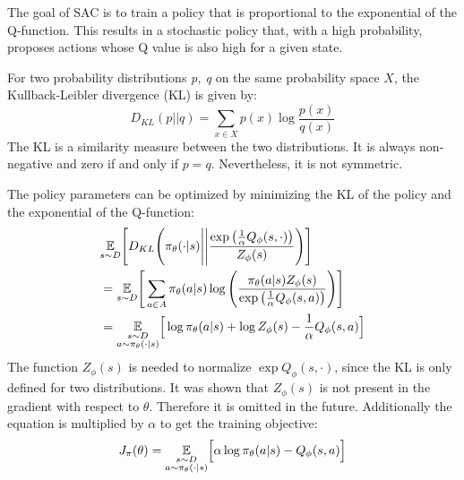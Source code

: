 The goal of SAC is to train a policy that is proportional to the exponential of the Q-function. This results in a stochastic policy that, with a high probability, proposes actions whose Q value is also high for a given state.
\begin{definition}
    For two probability distributions \emph{p, q} on the same probability space $X$, the Kullback-Leibler divergence (KL) \cite{kullbackInformationSufficiency1951} is given by:
    \begin{equation}
        D_{KL}(p||q) = \sum_{x\in X}p(x) \log \frac{p(x)}{q(x)}
    \end{equation}
    The KL is a similarity measure between the two distributions. It is always non-negative and zero if and only if  $p = q$. Nevertheless, it is not symmetric.
\end{definition}
The policy parameters can be optimized by minimizing the KL of the policy and the exponential of the Q-function:
\begin{align}
    & \underset{s\sim D}{\mathbb{E}}\Bigg[D_{KL}\Bigg(\pi_\theta(\cdot|s)\Bigg|\Bigg|\frac{\exp\big(\frac{1}{\alpha}Q_\phi(s,\cdot)\big)}{Z_\phi(s)}\Bigg)\Bigg]\\
    &= \underset{s\sim D}{\mathbb{E}}\Bigg[\sum_{a\in A} \pi_\theta(a|s) \log\Bigg(\frac{\pi_\theta(a|s)Z_\phi(s)}{\exp\big(\frac{1}{\alpha}Q_\phi(s,a)\big)}\Bigg)\Bigg]\\
    &= \underset{\begin{subarray}{c}
        s\sim D\\
        a\sim \pi_\theta(\cdot|s)
    \end{subarray}}{\mathbb{E}}\Big[\log\pi_\theta(a|s)+\log Z_\phi(s)-\frac{1}{\alpha}Q_\phi(s,a)\Big]
    \label{eq:pi-kl-3}
\end{align}
The function $Z_\phi(s)$ is needed to normalize $\exp Q_\phi(s, \cdot)$, since the KL is only defined for two distributions. It was shown that $Z_\phi(s)$ is not present in the gradient with respect to $\theta$. Therefore it is omitted in the future. Additionally the equation is multiplied by $\alpha$ to get the training objective:
\begin{equation}
    J_\pi(\theta) = \underset{\begin{subarray}{c}
        s\sim D\\
        a\sim \pi_\theta(\cdot|s)
    \end{subarray}}{\mathbb{E}}\Big[\alpha\log\pi_\theta(a|s)-Q_\phi(s,a)\Big]
    \label{eq:pi-objective-no-reparam}
\end{equation}
